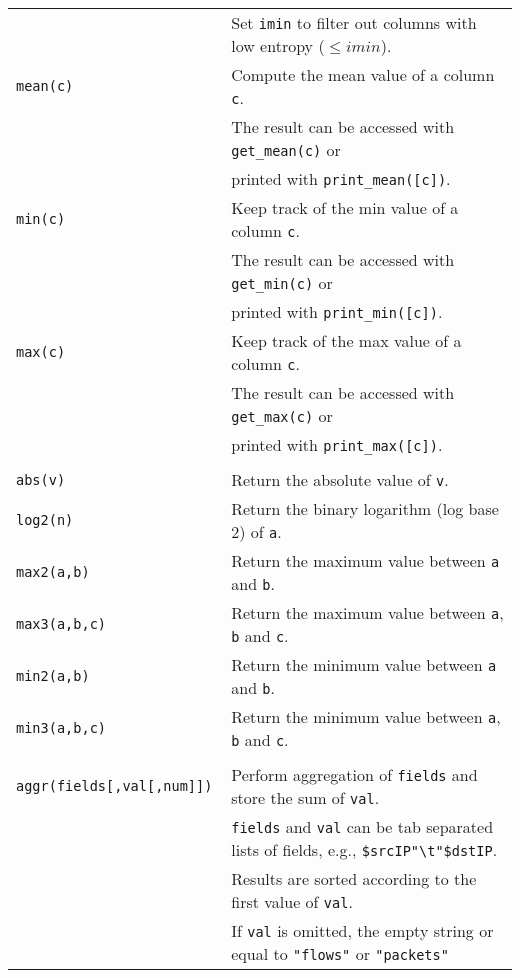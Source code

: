 \documentclass[documentation]{subfiles}
\begin{document}
\begin{longtable}{>{\tt}ll}
                                & Set {\tt imin} to filter out columns with low entropy ($\leq imin$).\\
    mean(c)                     & Compute the mean value of a column {\tt c}.\\
                                & The result can be accessed with {\tt get\_mean(c)} or\\
                                & printed with {\tt print\_mean([c])}.\\
    min(c)                      & Keep track of the min value of a column {\tt c}.\\
                                & The result can be accessed with {\tt get\_min(c)} or\\
                                & printed with {\tt print\_min([c])}.\\
    max(c)                      & Keep track of the max value of a column {\tt c}.\\
                                & The result can be accessed with {\tt get\_max(c)} or\\
                                & printed with {\tt print\_max([c])}.\\
    \\
    abs(v)                      & Return the absolute value of {\tt v}.\\
    log2(n)                     & Return the binary logarithm (log base 2) of {\tt a}.\\
    max2(a,b)                   & Return the maximum value between {\tt a} and {\tt b}.\\
    max3(a,b,c)                 & Return the maximum value between {\tt a}, {\tt b} and {\tt c}.\\
    min2(a,b)                   & Return the minimum value between {\tt a} and {\tt b}.\\
    min3(a,b,c)                 & Return the minimum value between {\tt a}, {\tt b} and {\tt c}.\\
    \\
    aggr(fields[,val[,num]])    & Perform aggregation of {\tt fields} and store the sum of {\tt val}.\\
                                & {\tt fields} and {\tt val} can be tab separated lists of fields, e.g., {\tt \$srcIP"\textbackslash{}t"\$dstIP}.\\
                                & Results are sorted according to the first value of {\tt val}.\\
                                & If {\tt val} is omitted, the empty string or equal to {\tt "flows"} or {\tt "packets"}\\

\end{longtable}
\end{document}
